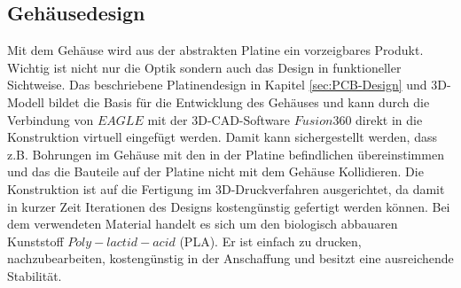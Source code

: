 
\subsection{Gehäusedesign}
Mit dem Gehäuse wird aus der abstrakten Platine ein vorzeigbares Produkt. Wichtig ist nicht nur die Optik sondern auch das Design in funktioneller Sichtweise. Das beschriebene Platinendesign in Kapitel \ref{sec:PCB-Design} und 3D-Modell bildet die Basis für die Entwicklung des Gehäuses und kann durch die Verbindung von $EAGLE$ mit der 3D-CAD-Software $Fusion360$ direkt in die Konstruktion virtuell  eingefügt werden. Damit kann sichergestellt werden, dass z.B. Bohrungen im Gehäuse mit den in der Platine befindlichen übereinstimmen und das die Bauteile auf der Platine nicht mit dem Gehäuse Kollidieren. Die Konstruktion ist auf die Fertigung im 3D-Druckverfahren ausgerichtet, da damit in kurzer Zeit Iterationen des Designs kostengünstig gefertigt werden können. Bei dem verwendeten Material handelt es sich um den biologisch abbauaren Kunststoff $Poly-lactid-acid$ (PLA). Er ist einfach zu drucken, nachzubearbeiten, kostengünstig in der Anschaffung und besitzt eine ausreichende Stabilität.


